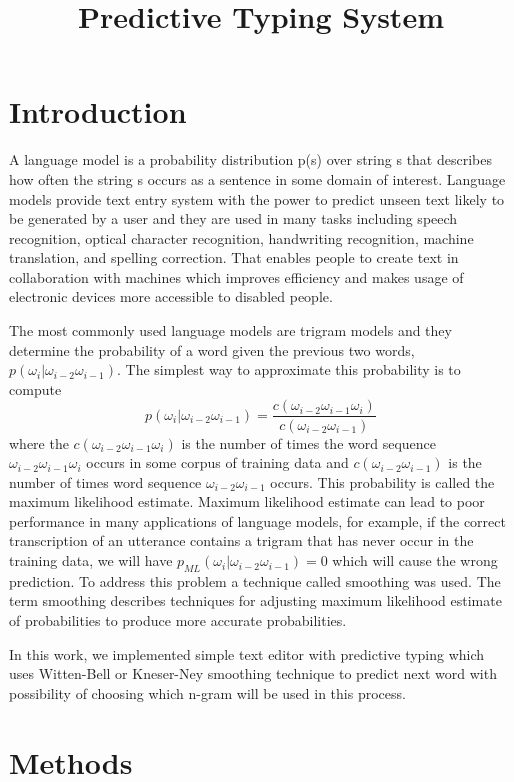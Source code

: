 \documentclass[10pt, a4paper]{article}
\title{Predictive Typing System}
\begin{document}
\maketitleabstract

\section{Introduction}
A language model is a probability distribution p(s) over string s that describes how often the string s occurs as a sentence in some domain of interest. 
Language models provide text entry system with the power to predict unseen text likely to be generated by a user and they are used in many tasks including speech recognition, optical character recognition, handwriting recognition, machine translation, and spelling correction.  That enables people to create text in collaboration with machines which improves efficiency and makes usage of electronic devices more accessible to disabled people. 

The most commonly used language models are trigram models and they determine the probability of a word given the previous two words, $ p(\omega_i|\omega_{i-2}\omega_{i-1}) $. The simplest way to approximate this probability is to compute 
\begin{equation}
p(\omega_i|\omega_{i-2}\omega_{i-1}) = \frac{c(\omega_{i-2}\omega_{i-1}\omega_i)}{c(\omega_{i-2}\omega_{i-1})}
\end{equation}
where the $ c(\omega_{i-2}\omega_{i-1}\omega_i) $ is the number of times the word sequence $ \omega_{i-2}\omega_{i-1}\omega_i $ occurs in some corpus of training data and $ c(\omega_{i-2}\omega_{i-1}) $ is the number of times word sequence $ \omega_{i-2}\omega_{i-1} $ occurs. This probability is called the maximum likelihood estimate. Maximum likelihood estimate can lead to poor performance in many applications of language models, for example, if the correct transcription of an utterance contains a trigram that has never occur in the training data, we will have $ p_{ML}(\omega_i|\omega_{i-2}\omega_{i-1})=0 $ which will cause the wrong prediction. To address this problem a technique called smoothing was used. The term smoothing describes techniques for adjusting maximum likelihood estimate of probabilities to produce more accurate probabilities. 

In this work, we implemented simple text editor with predictive typing which uses Witten-Bell or Kneser-Ney smoothing technique to predict next word with possibility of choosing which n-gram will be used in this process.  


\section{Methods}
\end{document}
